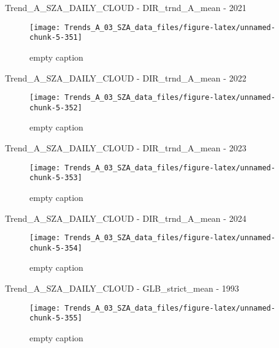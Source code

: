 \documentclass[
  10pt,
  a4paper,oneside]{article}
\begin{document}
Trend\_A\_SZA\_DAILY\_CLOUD - DIR\_trnd\_A\_mean - 2021

\begin{figure}[!ht]

{\centering \texttt{[image: Trends\_A\_03\_SZA\_data\_files/figure-latex/unnamed-chunk-5-351]} 

}

\caption{ empty caption }\label{fig:unnamed-chunk-5-351}
\end{figure}

Trend\_A\_SZA\_DAILY\_CLOUD - DIR\_trnd\_A\_mean - 2022

\begin{figure}[!ht]

{\centering \texttt{[image: Trends\_A\_03\_SZA\_data\_files/figure-latex/unnamed-chunk-5-352]} 

}

\caption{ empty caption }\label{fig:unnamed-chunk-5-352}
\end{figure}

Trend\_A\_SZA\_DAILY\_CLOUD - DIR\_trnd\_A\_mean - 2023

\begin{figure}[!ht]

{\centering \texttt{[image: Trends\_A\_03\_SZA\_data\_files/figure-latex/unnamed-chunk-5-353]} 

}

\caption{ empty caption }\label{fig:unnamed-chunk-5-353}
\end{figure}

Trend\_A\_SZA\_DAILY\_CLOUD - DIR\_trnd\_A\_mean - 2024

\begin{figure}[!ht]

{\centering \texttt{[image: Trends\_A\_03\_SZA\_data\_files/figure-latex/unnamed-chunk-5-354]} 

}

\caption{ empty caption }\label{fig:unnamed-chunk-5-354}
\end{figure}

Trend\_A\_SZA\_DAILY\_CLOUD - GLB\_strict\_mean - 1993

\begin{figure}[!ht]

{\centering \texttt{[image: Trends\_A\_03\_SZA\_data\_files/figure-latex/unnamed-chunk-5-355]} 

}

\caption{ empty caption }\label{fig:unnamed-chunk-5-355}
\end{figure}
\end{document}
